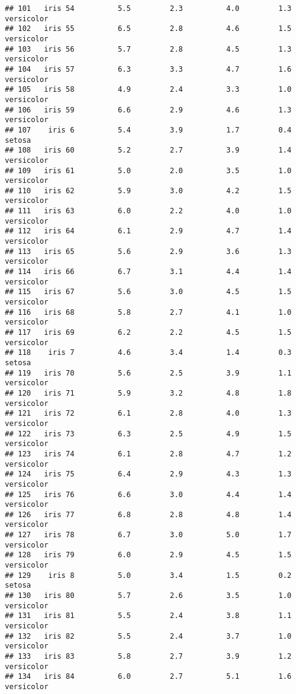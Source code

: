 \documentclass[
]{article}
\begin{document}
\begin{verbatim}
## 101   iris 54          5.5         2.3          4.0         1.3 versicolor
## 102   iris 55          6.5         2.8          4.6         1.5 versicolor
## 103   iris 56          5.7         2.8          4.5         1.3 versicolor
## 104   iris 57          6.3         3.3          4.7         1.6 versicolor
## 105   iris 58          4.9         2.4          3.3         1.0 versicolor
## 106   iris 59          6.6         2.9          4.6         1.3 versicolor
## 107    iris 6          5.4         3.9          1.7         0.4     setosa
## 108   iris 60          5.2         2.7          3.9         1.4 versicolor
## 109   iris 61          5.0         2.0          3.5         1.0 versicolor
## 110   iris 62          5.9         3.0          4.2         1.5 versicolor
## 111   iris 63          6.0         2.2          4.0         1.0 versicolor
## 112   iris 64          6.1         2.9          4.7         1.4 versicolor
## 113   iris 65          5.6         2.9          3.6         1.3 versicolor
## 114   iris 66          6.7         3.1          4.4         1.4 versicolor
## 115   iris 67          5.6         3.0          4.5         1.5 versicolor
## 116   iris 68          5.8         2.7          4.1         1.0 versicolor
## 117   iris 69          6.2         2.2          4.5         1.5 versicolor
## 118    iris 7          4.6         3.4          1.4         0.3     setosa
## 119   iris 70          5.6         2.5          3.9         1.1 versicolor
## 120   iris 71          5.9         3.2          4.8         1.8 versicolor
## 121   iris 72          6.1         2.8          4.0         1.3 versicolor
## 122   iris 73          6.3         2.5          4.9         1.5 versicolor
## 123   iris 74          6.1         2.8          4.7         1.2 versicolor
## 124   iris 75          6.4         2.9          4.3         1.3 versicolor
## 125   iris 76          6.6         3.0          4.4         1.4 versicolor
## 126   iris 77          6.8         2.8          4.8         1.4 versicolor
## 127   iris 78          6.7         3.0          5.0         1.7 versicolor
## 128   iris 79          6.0         2.9          4.5         1.5 versicolor
## 129    iris 8          5.0         3.4          1.5         0.2     setosa
## 130   iris 80          5.7         2.6          3.5         1.0 versicolor
## 131   iris 81          5.5         2.4          3.8         1.1 versicolor
## 132   iris 82          5.5         2.4          3.7         1.0 versicolor
## 133   iris 83          5.8         2.7          3.9         1.2 versicolor
## 134   iris 84          6.0         2.7          5.1         1.6 versicolor

\end{verbatim}
\end{document}
